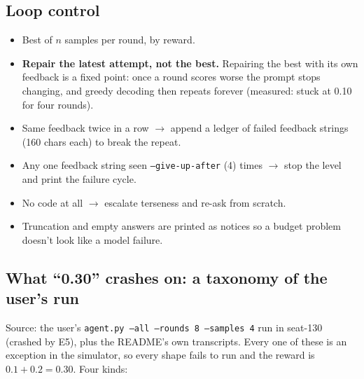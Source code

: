 \documentclass[11pt]{article}
\newcommand{\code}[1]{\texttt{#1}}
\begin{document}
\subsection{Loop control}
\begin{itemize}
  \item Best of $n$ samples per round, by reward.
  \item \textbf{Repair the latest attempt, not the best.} Repairing the best with its own feedback
        is a fixed point: once a round scores worse the prompt stops changing, and greedy decoding
        then repeats forever (measured: stuck at 0.10 for four rounds).
  \item Same feedback twice in a row $\to$ append a ledger of failed feedback strings
        (160 chars each) to break the repeat.
  \item Any one feedback string seen \code{--give-up-after} (4) times $\to$ stop the level and
        print the failure cycle.
  \item No code at all $\to$ escalate terseness and re-ask from scratch.
  \item Truncation and empty answers are printed as notices so a budget problem doesn't look like
        a model failure.
\end{itemize}

\subsection{What ``0.30'' crashes on: a taxonomy of the user's run}
Source: the user's \code{agent.py --all --rounds 8 --samples 4} run in seat-130 (crashed by E5),
plus the README's own transcripts. Every one of these is an exception in the simulator, so every
shape fails to run and the reward is $0.1+0.2=0.30$. Four kinds:
\end{document}
